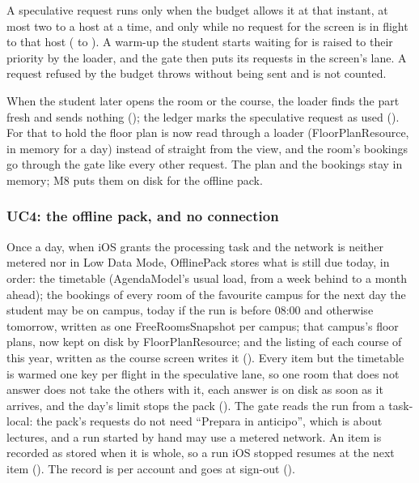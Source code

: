 A speculative request runs only when the budget allows it at that instant, at most
two to a host at a time, and only while no request for the screen is in flight to
that host ( to ). A warm-up the student starts waiting for is
raised to their priority by the loader, and the gate then puts its requests in the
screen's lane. A request refused by the budget throws without being sent and is not
counted.

When the student later opens the room or the course, the loader finds the part
fresh and sends nothing (); the ledger marks the speculative request as
used (). For that to hold the floor plan is now read through a loader
(FloorPlanResource, in memory for a day) instead of straight from the view, and the
room's bookings go through the gate like every other request. The plan and the
bookings stay in memory; M8 puts them on disk for the offline pack.

\subsubsection{UC4: the offline pack, and no connection}
Once a day, when iOS grants the processing task and the network is neither
metered nor in Low Data Mode, OfflinePack stores what is still due today, in
order: the timetable (AgendaModel's usual load, from a week behind to a month
ahead); the bookings of every room of the favourite campus for the next day the
student may be on campus, today if the run is before 08:00 and otherwise
tomorrow, written as one FreeRoomsSnapshot per campus; that campus's floor plans,
now kept on disk by FloorPlanResource; and the listing of each course of this
year, written as the course screen writes it (). Every item but the
timetable is warmed one key per flight in the speculative lane, so one room that
does not answer does not take the others with it, each answer is on disk as soon
as it arrives, and the day's limit stops the pack (). The gate reads
the run from a task-local: the pack's requests do not need ``Prepara in
anticipo'', which is about lectures, and a run started by hand may use a metered
network. An item is recorded as stored when it is whole, so a run iOS stopped
resumes at the next item (). The record is per account and goes at
sign-out ().

